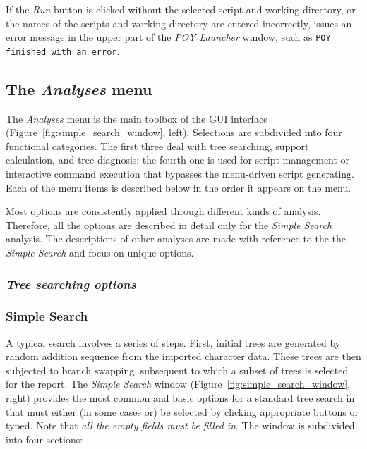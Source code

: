 If the \emph{Run} button is clicked without the selected script and
working directory, or the names of the scripts and working directory are entered incorrectly, \poy issues an
error message in the upper part of the \emph{POY Launcher} window,
such as \texttt{POY finished with an error}.

\subsection{The \emph{Analyses} menu}
The \emph{Analyses} menu is the main toolbox of the \poy GUI interface (Figure~\ref{fig:simple_search_window}, left). Selections are subdivided into four functional categories. The first three deal with tree searching, support calculation, and tree diagnosis; the fourth one is used for  script management or interactive command execution that bypasses the menu-driven script generating. Each of the menu items is described below in the order it appears on the menu.

Most options are consistently applied through different kinds of analysis. Therefore, all the options are described in detail only for the \emph{Simple Search} analysis. The descriptions of other analyses are made with reference to the the \emph{Simple Search} and focus on unique options.

\subsubsection{\emph{Tree searching options}}

\subsubsection{Simple Search}
A typical search involves a series of steps. First, initial trees are generated by random addition sequence from the imported character data. These trees are then subjected to branch swapping, subsequent to which a subset of trees is selected for the report.
The \emph{Simple Search} window (Figure~\ref{fig:simple_search_window}, right)
provides the most common and basic options for a standard tree search
in \poy that must either (in some cases or) be selected by clicking appropriate buttons or typed. Note that \emph{all the empty fields must be filled in}. The window is subdivided into four sections: 

